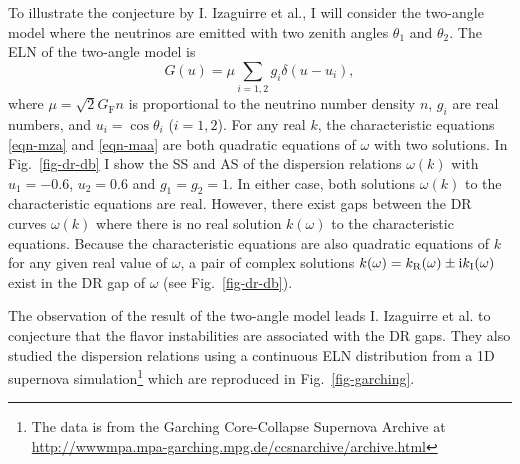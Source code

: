 
To illustrate the conjecture by I. Izaguirre et al., I will consider the two-angle model where the neutrinos are emitted with two zenith angles $\theta_1$ and $\theta_2$. The ELN of the two-angle model is
\begin{equation}
G(u)= \mu \sum_{i=1,2} g_i \delta(u - u_i),
\end{equation}
where $\mu = \sqrt{2}G_{\mathrm F} n$ is proportional to the neutrino number density $n$, $g_i$ are real numbers, and $u_i=\cos \theta_i$ ($i=1,2$). For any real $k$, the characteristic equations \eqref{eqn-mza} and \eqref{eqn-maa} are both quadratic equations of $\omega$ with two solutions.
In Fig.~\ref{fig-dr-db} I show the SS and AS of the dispersion relations $\omega(k)$ with $u_1=-0.6$, $u_2=0.6$ and $g_1=g_2=1$. In either case, both solutions $\omega(k)$ to the characteristic equations are real. However, there exist gaps between the DR curves $\omega(k)$ where there is no real solution $k(\omega)$ to the characteristic equations. Because the characteristic equations are also quadratic equations of $k$ for any given real value of $\omega$, a pair of complex solutions $k (\omega) = k_{\mathrm R} (\omega) \pm \mathrm{i} k_{\mathrm I}(\omega)$ exist in the DR gap of $\omega$ (see Fig.~\ref{fig-dr-db}).

The observation of the result of the two-angle model leads I. Izaguirre et al. to conjecture that the flavor instabilities are associated with the DR gaps. They also studied the dispersion relations using a continuous ELN distribution from a 1D supernova simulation\footnote{The data is from the Garching Core-Collapse Supernova Archive at \url{http://wwwmpa.mpa-garching.mpg.de/ccsnarchive/archive.html} } which are reproduced in Fig.~\ref{fig-garching}.

